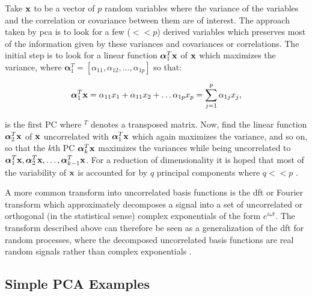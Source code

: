 Take $\textrm{\textbf{x}}$ to be a vector of $p$ random variables where the variance of the variables and the correlation or covariance between them are of interest. The approach taken by \gls{pca} is to look for a few ($<<p$) derived variables which preserves most of the information given by these variances and covariances or correlations. The initial step is to look for a linear function $\boldsymbol\alpha_1^T \textrm{\textbf{x}}$ of $\textrm{\textbf{x}}$ which maximizes the variance, where $\boldsymbol\alpha_1^T =  [\alpha_{1{}1},\alpha_{1{}2},\ldots,\alpha_{1{}p}]$ so that:

\begin{equation}\label{eq:PCAdef}
\boldsymbol\alpha_1^T \textrm{\textbf{x}}= \alpha_{1{}1}x_1 +\alpha_{1{}1} x_2 + \ldots \alpha_{1{}p} x_p = \sum^p_{j=1}\alpha_{1{}j}x_j,
\end{equation}

is the first PC where ${}^T$ denotes a transposed matrix.
Now, find the linear function $\boldsymbol\alpha_2^T \textrm{\textbf{x}}$ of $\textrm{\textbf{x}}$ uncorrelated with $\boldsymbol\alpha_1^T \textrm{\textbf{x}}$ which again maximizes the variance, and so on, so that the $k$th PC $\boldsymbol\alpha_k^T \textrm{\textbf{x}}$ maximizes the variances while being uncorrelated to $\boldsymbol\alpha_1^T \textrm{\textbf{x}}, \boldsymbol\alpha_2^T \textrm{\textbf{x}}, \ldots, \boldsymbol\alpha_{k-1}^T \textrm{\textbf{x}}$. For a reduction of dimensionality it is hoped that most of the variability of $\textrm{\textbf{x}}$ is accounted for by $q$ principal components where $q<<p$ \citep[chap. 1]{Jolliffe1986}.

A more common transform into uncorrelated basis functions is the \gls{dft} or Fourier transform which approximately decomposes a signal into a set of uncorrelated or orthogonal (in the statistical sense) complex exponentials of the form $e^{i\omega t}$. The transform described above can therefore be seen as a generalization of the \gls{dft} for random processes, where the decomposed uncorrelated basis functions are real random signals rather than complex exponentials \citep[chap. 4.6]{Therrien1992}.

\subsection{Simple PCA Examples}

